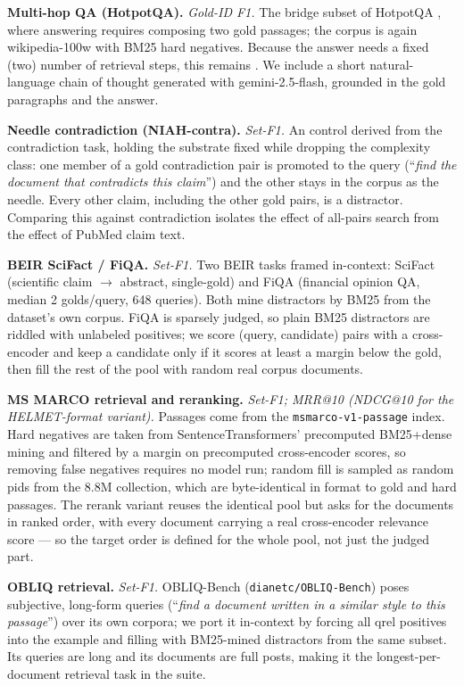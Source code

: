 \textbf{Multi-hop QA (HotpotQA).} \emph{Gold-ID F1.} The bridge subset of HotpotQA \citep{Yang2018HotpotQAAD}, where answering requires composing two gold passages; the corpus is again wikipedia-100w with BM25 hard negatives. Because the answer needs a fixed (two) number of retrieval steps, this remains . We include a short natural-language chain of thought generated with gemini-2.5-flash, grounded in the gold paragraphs and the answer.

\textbf{Needle contradiction (NIAH-contra).} \emph{Set-F1.} An  control derived from the  contradiction task, holding the substrate fixed while dropping the complexity class: one member of a gold contradiction pair is promoted to the query (``\emph{find the document that contradicts this claim}'') and the other stays in the corpus as the needle. Every other claim, including the other gold pairs, is a distractor. Comparing this against contradiction isolates the effect of all-pairs search from the effect of PubMed claim text.

\textbf{BEIR SciFact / FiQA.} \emph{Set-F1.} Two BEIR tasks framed in-context: SciFact (scientific claim $\to$ abstract, single-gold) and FiQA (financial opinion QA, median 2 golds/query, 648 queries). Both mine distractors by BM25 from the dataset's own corpus. FiQA is sparsely judged, so plain BM25 distractors are riddled with unlabeled positives; we score (query, candidate) pairs with a cross-encoder and keep a candidate only if it scores at least a margin below the gold, then fill the rest of the pool with random real corpus documents.

\textbf{MS MARCO retrieval and reranking.} \emph{Set-F1; MRR@10 (NDCG@10 for the HELMET-format variant).} Passages come from the \texttt{msmarco-v1-passage} index. Hard negatives are taken from SentenceTransformers' precomputed BM25+dense mining and filtered by a margin on precomputed cross-encoder scores, so removing false negatives requires no model run; random fill is sampled as random pids from the 8.8M collection, which are byte-identical in format to gold and hard passages. The rerank variant reuses the identical pool but asks for the documents in ranked order, with every document carrying a real cross-encoder relevance score --- so the target order is defined for the whole pool, not just the judged part.

\textbf{OBLIQ retrieval.} \emph{Set-F1.} OBLIQ-Bench (\texttt{dianetc/OBLIQ-Bench}) poses subjective, long-form queries (``\emph{find a document written in a similar style to this passage}'') over its own corpora; we port it in-context by forcing all qrel positives into the example and filling with BM25-mined distractors from the same subset. Its queries are long and its documents are full posts, making it the longest-per-document retrieval task in the suite.

